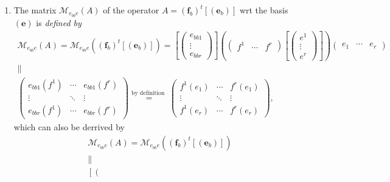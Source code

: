 \documentclass[aps,preprint]{revtex4}
\begin{document}
\begin{enumerate}
\begin{enumerate}
\item The matrix $\mathcal{M}_{e_{bb}e}\left( A\right) $ of the operator $%
A=\left( \boldsymbol{f}_{b}\right) ^{t}\left[ \left( \boldsymbol{e}%
_{b}\right) \right] $ wrt the basis $\left( \boldsymbol{e}\right) $ is \emph{%
defined by} 
\begin{gather}
\mathcal{M}_{e_{bb}e}\left( A\right) =\mathcal{M}_{e_{bb}e}\left( \left( 
\boldsymbol{f}_{b}\right) ^{t}\left[ \left( \boldsymbol{e}_{b}\right) \right]
\right) =\left[ \left( 
\begin{array}{c}
e_{bb1} \\ 
\vdots \\ 
e_{bbr}%
\end{array}%
\right) \right] \left( \left( 
\begin{array}{ccc}
f^{1} & \cdots & f^{r}%
\end{array}%
\right) \left[ \left( 
\begin{array}{c}
e^{1} \\ 
\vdots \\ 
e^{r}%
\end{array}%
\right) \right] \right) \left( 
\begin{array}{ccc}
e_{1} & \cdots & e_{r}%
\end{array}%
\right) \\
\parallel \\
\left( 
\begin{array}{ccc}
e_{bb1}\left( f^{1}\right) & \cdots & e_{bb1}\left( f^{r}\right) \\ 
\vdots & \ddots & \vdots \\ 
e_{bbr}\left( f^{1}\right) & \cdots & e_{bbr}\left( f^{r}\right)%
\end{array}%
\right) \overset{\text{by definition }}{=}\left( 
\begin{array}{ccc}
f^{1}\left( e_{1}\right) & \cdots & f^{r}\left( e_{1}\right) \\ 
\vdots & \ddots & \vdots \\ 
f^{1}\left( e_{r}\right) & \cdots & f^{r}\left( e_{r}\right)%
\end{array}%
\right) ,
\end{gather}%
which can also be derrived by 
\begin{gather}
\mathcal{M}_{e_{bb}e}\left( A\right) =\mathcal{M}_{e_{bb}e}\left( \left( 
\boldsymbol{f}_{b}\right) ^{t}\left[ \left( \boldsymbol{e}_{b}\right) \right]
\right) \\
\parallel \\
\left[ \left( 
\begin{array}{c}

\end{array}
\end{gather}
\end{enumerate}
\end{enumerate}
\end{document}
